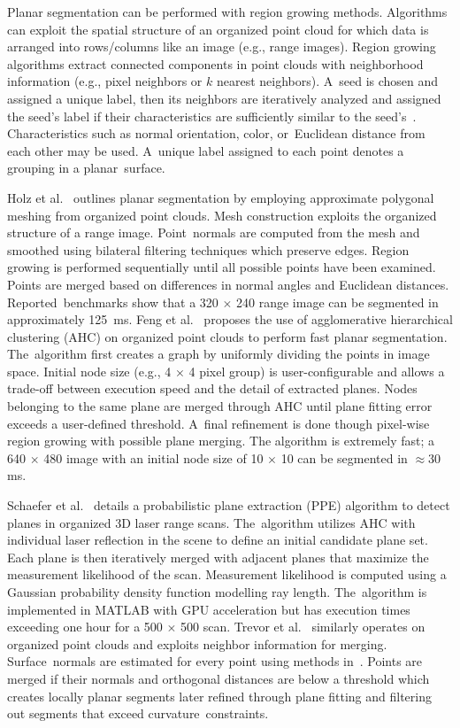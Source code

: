 Planar segmentation can be performed with region growing methods.  Algorithms can exploit the spatial structure of an organized point cloud for which data is arranged into rows/columns like an image (e.g., range images).  Region growing algorithms extract connected components in point clouds with neighborhood information (e.g., pixel neighbors or $k$ nearest neighbors). A~seed is chosen and assigned a unique label, then its neighbors are iteratively analyzed and assigned the seed’s label if their characteristics are sufficiently similar to the seed's~\cite{kaiser_survey_2019}. Characteristics such as normal orientation, color, or~Euclidean distance from each other may be used. A~unique label assigned to each point denotes a grouping in a planar~surface.

Holz et al.~\cite{lee_fast_2013} outlines planar segmentation by employing approximate polygonal meshing from organized point clouds. Mesh construction exploits the organized structure of a range image. Point~normals are computed from the mesh and smoothed using bilateral filtering techniques which preserve edges. Region growing is performed sequentially until all possible points have been examined. Points are merged based on differences in normal angles and Euclidean distances. Reported~benchmarks show that a 320 $\times$ 240 range image can be segmented in approximately 125~ms. 
Feng et al.~\cite{feng_fast_2014} proposes the use of agglomerative hierarchical clustering (AHC) on organized point clouds to perform fast planar segmentation.  The~algorithm first creates a graph by uniformly dividing the points in image space. Initial node size (e.g., 4 $\times$ 4 pixel group) is user-configurable and allows a trade-off between execution speed and the detail of extracted planes. Nodes belonging to the same plane are merged through AHC until plane fitting error exceeds a user-defined threshold. A~final refinement is done though pixel-wise region growing with possible plane merging.  The algorithm is extremely fast; a 640 $\times$ 480 image with an initial node size of 10 $\times$ 10 can be segmented in $\approx$30 ms.

Schaefer et al.~\cite{schaefer_maximum_2019} details a probabilistic plane extraction (PPE) algorithm to detect planes in organized 3D laser range scans. The~algorithm utilizes AHC with individual laser reflection in the scene to define an initial candidate plane set. Each plane is then iteratively merged with adjacent planes that maximize the measurement likelihood of the scan. Measurement likelihood is computed using a Gaussian probability density function modelling ray length. The~algorithm is implemented in MATLAB with \ac{GPU} acceleration but has execution times exceeding one hour for a 500 $\times$ 500 scan.  Trevor et al.~\cite{trevor2013efficient} similarly operates on organized point clouds and exploits neighbor information for merging. Surface~normals are estimated for every point using methods in~\cite{lee_fast_2013}.  Points are merged if their normals and orthogonal distances are below a threshold which creates locally planar segments later refined through plane fitting and filtering out segments that exceed curvature~constraints.

